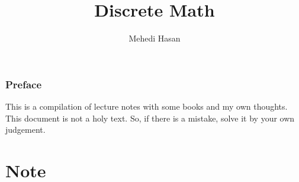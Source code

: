 \documentclass[12pt,oneside,a4paper]{book}
\begin{document}
    \title{Discrete Math}
    \author{Mehedi Hasan}
    \maketitle
    \newpage
    \section*{Preface}
    This is a compilation of lecture notes with some books and my own thoughts. This document is not a holy text. So, if there is a mistake, solve it by your own judgement.
    \newpage
    \tableofcontents
    \newpage
    \part{Note}
    
    
\end{document}
